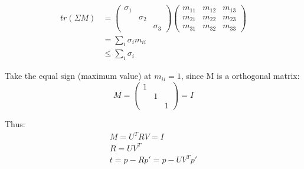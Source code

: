 \documentclass{article}
\begin{document}
\begin{align}
    tr(\Sigma M)&=
\begin{pmatrix}
    \sigma_1 &  & \\
     & \sigma_2 & \\
    &  & \sigma_3
\end{pmatrix}
\begin{pmatrix}
    m_{11} & m_{12} & m_{13} \\
    m_{21} & m_{22} & m_{23} \\
    m_{31} & m_{32} & m_{33}
\end{pmatrix}
\\
&=\sum_{i}\sigma_im_{ii}\\
&\leq \sum_{i}\sigma_i
\end{align}

\par
Take the equal sign (maximum value) at $m_{ii}=1$,
since M is a orthogonal matrix:
\begin{equation}
    M=
\begin{pmatrix}
    1 &  & \\
     & 1 & \\
    &  & 1
\end{pmatrix}
=I
\end{equation}
\par
Thus:
\begin{gather}
    M=U^TRV=I\\
    R = UV^T\\
    t= p-Rp'=p-UV^Tp'
\end{gather}
% 
% 
\end{document}
